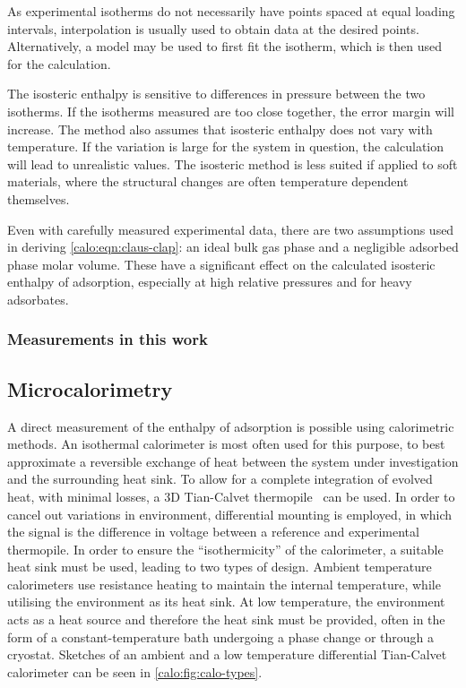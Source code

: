 As experimental isotherms do not necessarily have points spaced
at equal loading intervals, interpolation is usually used to obtain
data at the desired points. Alternatively, a model may be used
to first fit the isotherm, which is then used for the calculation.

The isosteric enthalpy is sensitive to differences in pressure between
the two isotherms. If the isotherms measured are too close together,
the error margin will increase. The method also assumes that isosteric
enthalpy does not vary with temperature. If the
variation is large for the system in question, the calculation will
lead to unrealistic values. The isosteric method is less suited
if applied to soft materials, where the structural changes are
often temperature dependent themselves.

Even with carefully measured experimental data, there are two
assumptions used in deriving \autoref{calo:eqn:claus-clap}:
an ideal bulk gas phase and a negligible adsorbed phase
molar volume. These have a significant effect on the calculated
isosteric enthalpy of adsorption, especially at high relative pressures
and for heavy adsorbates.

\subsubsection{Measurements in this work}

\subsection{Microcalorimetry}\label{calo:method:calo}

A direct measurement of the enthalpy of adsorption is possible using
calorimetric methods.
An isothermal calorimeter is most often used for this purpose,
to best approximate a reversible exchange of heat between the
system under investigation and the surrounding
heat sink. To allow for a complete integration of evolved heat,
with minimal losses, a 3D Tian-Calvet thermopile~\cite{calvetRecentProgressMicrocalorimetry1963}
can be used. In order to cancel out variations in environment,
differential mounting is employed, in which the signal
is the difference in voltage between a reference and experimental
thermopile. In order to ensure the ``isothermicity'' of the calorimeter, a
suitable heat sink must be used, leading to two types of design.
Ambient temperature calorimeters use resistance heating to
maintain the internal temperature, while utilising the environment
as its heat sink. At low temperature, the
environment acts as a heat source and therefore the heat sink must
be provided, often in the form of a constant-temperature bath
undergoing a phase change or through a cryostat. Sketches of
an ambient and a low temperature differential Tian-Calvet calorimeter
can be seen in \autoref{calo:fig:calo-types}.

